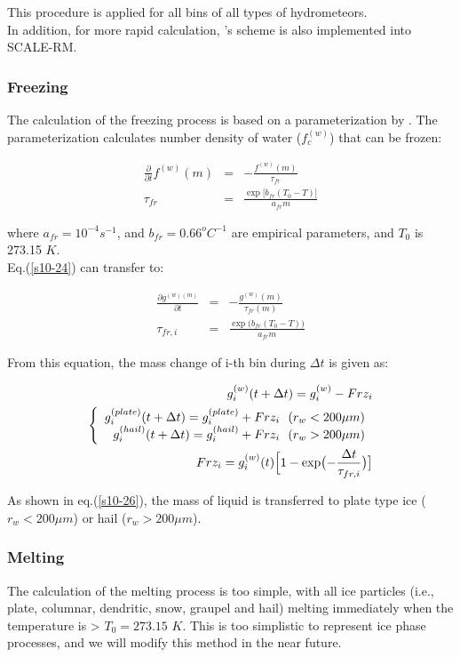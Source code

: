 This procedure is applied for all bins of all types of hydrometeors.\\
In addition, for more rapid calculation, \cite{sato_etal_2009}’s scheme is also implemented into SCALE-RM.

\subsubsection{Freezing}
The calculation of the freezing process is based on a parameterization by \cite{bigg_1953}. The parameterization calculates number density of water ($f_{c}^{(w)}$) that can be frozen:

\begin{eqnarray}
\frac{\partial}{\partial t}f^{(w)}(m)&=&-\frac{f^{(w)}(m)}{\tau_{fr}}\label{s10-24}\\
\tau_{fr}&=&\frac{\exp \bigl[b_{fr}(T_{0}-T)\bigr]}{a_{fr} m}\nonumber
\end{eqnarray}

where $a_{fr}=10^{-4}s^{-1}$, and $b_{fr}=0.66^{o}C^{-1}$ are empirical parameters, and $T_{0}$ is 273.15 $K$.\\
Eq.(\ref{s10-24}) can transfer to:

\begin{eqnarray}
\frac{\partial g^{(w)(m)}}{\partial t}&=&-\frac{g^{(w)}(m)}{\tau_{fr}(m)}\\
\tau_{fr,i}&=&\frac{\exp\bigl (b_{fr}(T_{0}-T)\bigr )}{a_{fr}m}\nonumber
\end{eqnarray}

From this equation, the mass change of i-th bin during $\Delta t$ is given as:

\begin{eqnarray}
g_{i}^{(w)}(t+\Delta t)=g_{i}^{(w)}-Frz_{i}\\
\left \{
\begin{array}{r}
g_{i}^{(plate)}(t+\Delta t)=g_{i}^{(plate)}+Frz_{i}\:\:\: (r_{w}<200\mu m)\\
g_{i}^{(hail)}(t+\Delta t)=g_{i}^{(hail)}+Frz_{i}\:\:\: (r_{w}>200\mu m)
\end{array} \right.\label{s10-26}\\
Frz_{i}=g_{i}^{(w)}(t)\Bigl [1-\exp\bigl (-\frac{\Delta t}{\tau_{fr,i}}\bigr )\bigr]\nonumber
\end{eqnarray}


 As shown in eq.(\ref{s10-26}), the mass of liquid is transferred to plate type ice ($r_{w}<200\mu m$) or hail ($r_{w}>200\mu m$).

\subsubsection{Melting}
The calculation of the melting process is too simple, with all ice particles (i.e., plate, columnar, dendritic, snow, graupel and hail) melting immediately when the temperature is > $T_{0}=273.15$ $K$. This is too simplistic to represent ice phase processes, and we will modify this method in the near future.


